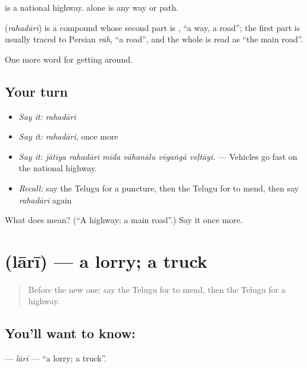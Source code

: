   is a national highway.  alone is any way or path.

\begin{cousinweb}
\textbf{} (\emph{rahadāri}) is a compound whose second part is , \textquotedblleft{}a way, a road\textquotedblright{}; the first part is usually traced to Persian \emph{rāh}, \textquotedblleft{}a road\textquotedblright{}, and the whole is read as \textquotedblleft{}the main road\textquotedblright{}.
\end{cousinweb}

\begin{grammarlens}[title={What you've built}]
One more word for getting around.
\end{grammarlens}

\subsection*{Your turn}
\begin{itemize}
\raggedright
  \item \emph{Say it:} \emph{rahadāri}
  \item \emph{Say it:} \emph{rahadāri}, once more
  \item \emph{Say it:} \emph{jātīya rahadāri mīda vāhanālu vēgaṅgā veḷtāyi.} — Vehicles go fast on the national highway.
  \item \emph{Recall:} say the Telugu for a puncture, then the Telugu for to mend, then say \emph{rahadāri} again
\end{itemize}

\begin{tcolorbox}[breakable,colback=teal!4,colframe=teal!35!black,title={Before you move on}]
What does  mean? (\textquotedblleft{}A highway; a main road\textquotedblright{}.) Say it once more.
\end{tcolorbox}
\section[\texorpdfstring{\te{లారీ} (lārī)}{లారీ (lārī)}]{ (lārī) — a lorry; a truck}

\label{lesson:TE-C445-lari}



\begin{quote}
Before the new one: say the Telugu for to mend, then the Telugu for a highway.
\end{quote}

\subsection*{You'll want to know: }
\textbf{} — \emph{lārī} — \textquotedblleft{}a lorry; a truck\textquotedblright{}.

